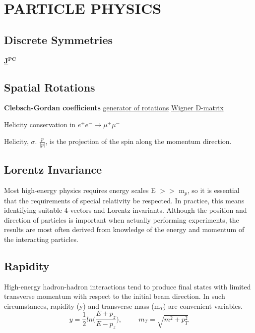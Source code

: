 \section{PARTICLE PHYSICS}
\subsection{Discrete Symmetries}

\href{https://physics.stackexchange.com/questions/178986/how-is-jpc-value-experimentally-determined-for-new-types-of-particles}{\textbf{J}$^{\textbf{PC}}$}

\subsection{Spatial Rotations}
\textbf{Clebsch-Gordan coeﬃcients}
\href{URL}{generator of rotations}
\href{https://en.wikipedia.org/wiki/Wigner_D-matrix}{Wigner D-matrix}

Helicity conservation in $e^+ e^- \rightarrow \mu^+ \mu^-$

Helicity, $\sigma$. $\frac{p}{|p|}$, is the projection of the spin along the momentum direction.

\subsection{Lorentz Invariance}
Most high-energy physics requires energy scales E $>>$ m$_p$, so it
is essential that the requirements of special relativity be respected. In
practice, this means identifying suitable 4-vectors and Lorentz invariants. 
Although the position and direction of particles is important when
actually performing experiments, the results are most often derived from
knowledge of the energy and momentum of the interacting particles.

\subsection{Rapidity}
High-energy hadron-hadron interactions tend to produce ﬁnal states
with limited transverse momentum with respect to the initial beam direction. 
In such circumstances, rapidity (y) and transverse mass (m$_T$) are convenient variables.
\begin{equation}
    y = \frac{1}{2} ln \Big(\frac{E+p_z}{E-p_z}\Big), \hspace{1cm} m_T = \sqrt{m^2 + p_T^2}
\end{equation}


\newpage